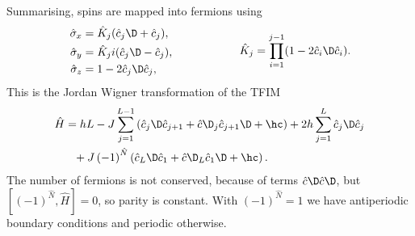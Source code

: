 Summarising, spins are mapped into fermions using
\begin{equation*}
	\left.\begin{aligned}
	    \hat{\sigma}_x &= \hat{K}_j(\hat{c}_j\D + \hat{c}_j) ,\\
	    \hat{\sigma}_y &= \hat{K}_j i(\hat{c}_j\D - \hat{c}_j) ,\\
	    \hat{\sigma}_z &= 1 - 2 \hat{c}_j\D \hat{c}_j,
	\end{aligned}\right.
	\hspace{10 mm} 
	\hspace{10 mm} 
	\hat{K}_j = \prod_{i=1}^{j-1} (1-2 \hat{c}_i\D \hat{c}_i).
\end{equation*}
This is the Jordan Wigner transformation of the TFIM
\begin{align*}
	\hat{H} &= h L - J \sum_{j=1}^{L-1} \left(\hat{c}_j\D \hat{c}_{j+1} + \hat{c}\D_j \hat{c}_{j+1}\D + \hc \right) +  2 h \sum_{j=1}^L \hat{c}_j\D \hat{c}_j \\  
	&\phantom{=} + J\left(-1\right)^{\hat{N}} \left(\hat{c}_L\D \hat{c}_1 +\hat{c}\D_L \hat{c}_{1}\D+\hc \right)
	.
\end{align*} 
The number of fermions is not conserved, because of terms $\hat{c}\D \hat{c}\D$, but $[(-1)^{\hat{N}}, \hat{H}]=0$, so parity is constant. With $(-1)^{\hat{N}}=1$ we have antiperiodic boundary conditions and periodic otherwise.



